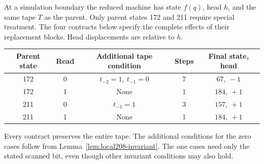 At a simulation boundary the reduced machine has state $f(q)$, head $h$,
and the same tape $T$ as the parent. Only parent states 172 and 211 require
special treatment. The four contracts below specify the complete effects
of their replacement blocks. Head displacements are relative to $h$.
\begin{center}
\begin{tabular}{ccccc}
\toprule
Parent state & Read & Additional tape condition & Steps & Final state, head\\
\midrule
172 & 0 & $t_{-2}=1,\ t_{-1}=0$ & 7 & $67,\ -1$\\
172 & 1 & None & 1 & $184,\ +1$\\
211 & 0 & $t_{-1}=1$ & 3 & $157,\ +1$\\
211 & 1 & None & 1 & $184,\ +1$\\
\bottomrule
\end{tabular}
\end{center}
Every contract preserves the entire tape. The additional conditions for
the zero cases follow from Lemma~\ref{lem:local208-invariant}. The one
cases need only the stated scanned bit, even though other invariant
conditions may also hold.

